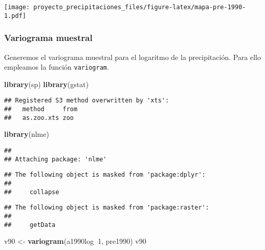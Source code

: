\documentclass[11pt,]{article}
\newenvironment{Shaded}{\begin{snugshade}}{\end{snugshade}}
\newcommand{\KeywordTok}[1]{\textcolor[rgb]{0.13,0.29,0.53}{\textbf{#1}}}
\newcommand{\DecValTok}[1]{\textcolor[rgb]{0.00,0.00,0.81}{#1}}
\newcommand{\StringTok}[1]{\textcolor[rgb]{0.31,0.60,0.02}{#1}}
\newcommand{\OperatorTok}[1]{\textcolor[rgb]{0.81,0.36,0.00}{\textbf{#1}}}
\newcommand{\NormalTok}[1]{#1}
\begin{document}
\texttt{[image: proyecto\_precipitaciones\_files/figure-latex/mapa-pre-1990-1.pdf]}

\subsubsection{Variograma muestral}\label{variograma-muestral}

Generemos el variograma muestral para el logaritmo de la precipitación.
Para ello empleamos la función \texttt{variogram}.

\begin{Shaded}
\begin{Highlighting}[]
\KeywordTok{library}\NormalTok{(sp)}
\KeywordTok{library}\NormalTok{(gstat)}
\end{Highlighting}
\end{Shaded}

\begin{verbatim}
## Registered S3 method overwritten by 'xts':
##   method     from
##   as.zoo.xts zoo
\end{verbatim}

\begin{Shaded}
\begin{Highlighting}[]
\KeywordTok{library}\NormalTok{(nlme)}
\end{Highlighting}
\end{Shaded}

\begin{verbatim}
## 
## Attaching package: 'nlme'
\end{verbatim}

\begin{verbatim}
## The following object is masked from 'package:dplyr':
## 
##     collapse
\end{verbatim}

\begin{verbatim}
## The following object is masked from 'package:raster':
## 
##     getData
\end{verbatim}

\begin{Shaded}
\begin{Highlighting}[]
\NormalTok{v90 <-}\StringTok{ }\KeywordTok{variogram}\NormalTok{(a1990log}\OperatorTok{~}\DecValTok{1}\NormalTok{, pre1990)}
\NormalTok{v90}
\end{Highlighting}
\end{Shaded}
\end{document}
